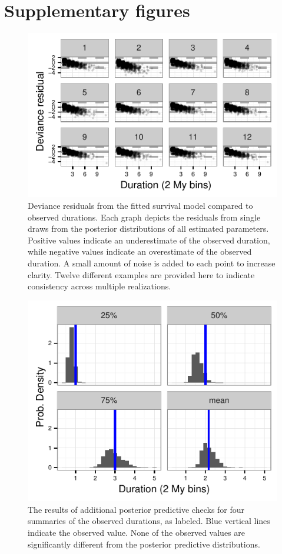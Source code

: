 \documentclass{article}
\begin{document}
\section{Supplementary figures}
\begin{figure}[ht]
  \centering
  \includegraphics[height = 0.5\textheight, width = \textwidth, keepaspectratio = true]{figure/residual_plot}
  \caption{Deviance residuals from the fitted survival model compared to observed durations. Each graph depicts the residuals from single draws from the posterior distributions of all estimated parameters. Positive values indicate an underestimate of the observed duration, while negative values indicate an overestimate of the observed duration. A small amount of noise is added to each point to increase clarity. Twelve different examples are provided here to indicate consistency across multiple realizations.}
  \label{fig:ppc_res}
\end{figure}

\begin{figure}[ht]
  \centering
  \includegraphics[height = 0.5\textheight, width = \textwidth, keepaspectratio = true]{figure/quant_ppc}
  \caption{The results of additional posterior predictive checks for four summaries of the observed durations, as labeled. Blue vertical lines indicate the observed value. None of the observed values are significantly different from the posterior predictive distributions.}
  \label{fig:ppc_quant}
\end{figure}
\end{document}
